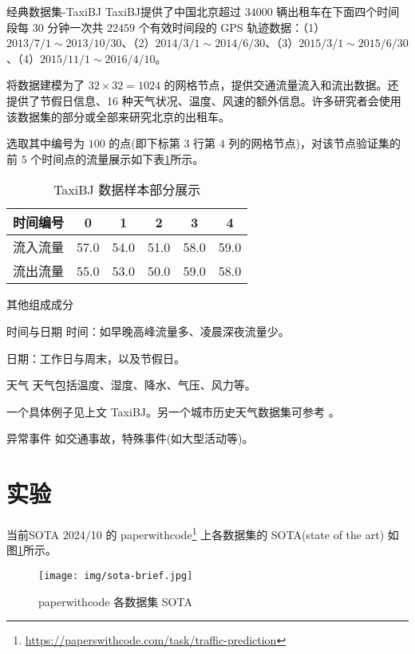 \documentclass{libs/format}
\begin{document}
\begin{frame}{经典数据集-TaxiBJ}
  TaxiBJ\cite{T-51}提供了中国北京超过 $34000$ 辆出租车在下面四个时间段每 $30$ 分钟一次共 $22459$ 个有效时间段的 GPS 轨迹数据：（1）$2013/7/1\sim2013/10/30$、（2）$2014/3/1\sim2014/6/30$、（3）$2015/3/1\sim2015/6/30$、（4）$2015/11/1\sim2016/4/10$。
  
  将数据建模为了 $32\times32=1024$ 的网格节点，提供交通流量流入和流出数据。还提供了节假日信息、16 种天气状况、温度、风速的额外信息。许多研究者会使用该数据集的部分或全部来研究北京的出租车。

  选取其中编号为 $100$ 的点(即下标第 $3$ 行第 $4$ 列的网格节点)，对该节点验证集的前 $5$ 个时间点的流量展示如下表\ref{table:taxibj}所示。

  \begin{table}[]  
    \centering\caption{TaxiBJ 数据样本部分展示}\label{table:taxibj}
    \begin{tabular}{|c|c|c|c|c|c|}  
    \hline  
    时间编号 & 0 & 1 & 2 & 3 & 4 \\ \hline  
    流入流量 & 57.0 & 54.0 & 51.0 & 58.0 & 59.0 \\ \hline  
    流出流量 & 55.0 & 53.0 & 50.0 & 59.0 & 58.0 \\ \hline  
    \end{tabular}  
  \end{table}
\end{frame}

  

\begin{frame}{其他组成成分}
  \begin{block}{时间与日期}
    时间：如早晚高峰流量多、凌晨深夜流量少。

    日期：工作日与周末，以及节假日。
  \end{block}
  \begin{block}{天气}
    天气包括温度、湿度、降水、气压、风力等。\cite{T-ZS2}

    一个具体例子见上文 TaxiBJ\cite{T-51}。另一个城市历史天气数据集可参考 \cite{T-70}。
  \end{block}
  \begin{block}{异常事件}
    如交通事故，特殊事件(如大型活动等)。
  \end{block}
\end{frame}

\section{实验}
\begin{frame}{当前SOTA}
  2024/10 的 paperwithcode\footnote[frame]{\url{https://paperswithcode.com/task/traffic-prediction}} 上各数据集的 SOTA(state of the art) 如图\ref{fig:sota-brief}所示。

  \begin{figure}
    \centering
    \texttt{[image: img/sota-brief.jpg]}
    \caption{paperwithcode 各数据集 SOTA}\label{fig:sota-brief}
  \end{figure}
\end{frame}
\end{document}

